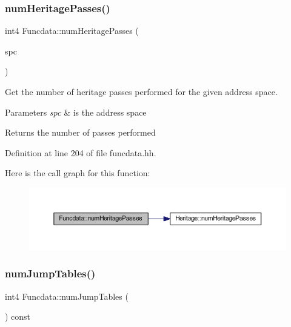 \subsubsection{\texorpdfstring{numHeritagePasses()}{numHeritagePasses()}}
{\footnotesize\ttfamily int4 Funcdata\+::num\+Heritage\+Passes (\begin{DoxyParamCaption}\item[{\mbox{\hyperlink{class_addr_space}{Addr\+Space}} $\ast$}]{spc }\end{DoxyParamCaption})\hspace{0.3cm}{\ttfamily [inline]}}



Get the number of heritage passes performed for the given address space. 


\begin{DoxyParams}{Parameters}
{\em spc} & is the address space \\
\hline
\end{DoxyParams}
\begin{DoxyReturn}{Returns}
the number of passes performed 
\end{DoxyReturn}


Definition at line 204 of file funcdata.\+hh.

Here is the call graph for this function\+:
\nopagebreak
\begin{figure}[H]
\begin{center}
\leavevmode
\includegraphics[width=350pt]{class_funcdata_a363bd02cb2f20cf1583951d5429a057b_cgraph}
\end{center}
\end{figure}
\mbox{\label{class_funcdata_a30603a803c816264c105023c3456bcd7}} 
\subsubsection{\texorpdfstring{numJumpTables()}{numJumpTables()}}
{\footnotesize\ttfamily int4 Funcdata\+::num\+Jump\+Tables (\begin{DoxyParamCaption}\item[{void}]{ }\end{DoxyParamCaption}) const\hspace{0.3cm}{\ttfamily [inline]}}



